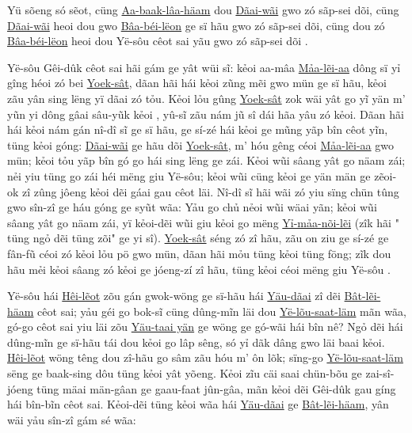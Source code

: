 \documentclass[twoside,twocolumn,a4paper,10pt]{memoir}
\begin{document}
\begin{scripture}
	Yü sõeng só sẽot, cüng \underline{Aa-baak-lâa-häam} dou \underline{Dãai-wãi} gwo zó sãp-sei dõi, cüng \underline{Dãai-wãi} heoi dou gwo \underline{Bâa-béi-lëon} ge sï hãu gwo zó sãp-sei dõi, cüng dou zó \underline{Bâa-béi-lëon} heoi dou Yë-sôu cêot sai yãu gwo zó sãp-sei dõi .
	
	Yë-sôu Gêi-dûk cêot sai hãi gám ge yât wüi sĩ: kẻoi aa-mâa \underline{Mảa-lẽi-aa} dông sï yỉ gîng héoi zó bei \underline{Yoek-sât}, dãan hãi hái kẻoi zũng mẽi gwo mün ge sï hãu, kẻoi zãu yân sing lëng yï dãai zó tỏu.
	Kẻoi lỏu gûng \underline{Yoek-sât} zok wäi yât go yĩ yän m' yũn yi dông gâai sâu-yũk kẻoi , yû-sĩ zãu nám jũ sî dái hãa yâu zó kẻoi.
	Dãan hãi hái kẻoi nám gán nî-dî sĩ ge sï hãu,  ge sí-zé hái kẻoi ge mũng yãp bîn cêot yĩn, tüng kẻoi góng: \underline{Dãai-wãi} ge hãu dõi \underline{Yoek-sât}, m' hóu gêng céoi \underline{Mảa-lẽi-aa} gwo mün; kẻoi tỏu yãp bîn gó go hái sing lëng ge zái.
	Kẻoi wũi sâang yât go näam zái; nẻi yiu tüng go zái héi mëng giu Yë-sôu; kẻoi wũi cüng kẻoi ge yän män ge zẽoi-ok zî zûng jôeng kẻoi dẽi gáai gau cêot läi.
	Nî-dî sĩ hãi wãi zó yiu sïng chün  tûng gwo sîn-zî ge háu góng ge syũt wãa:
	Yảu go chủ nẻoi wũi wäai yãn; kẻoi wũi sâang yât go näam zái, yï kẻoi-dẽi wũi giu kẻoi go mëng \underline{Yỉ-mảa-nõi-lẽi} (zîk hãi " tüng ngỏ dẽi tüng zõi" ge yi sî).
	\underline{Yoek-sât} séng zó zî hãu, zãu on ziu  ge sí-zé ge fân-fũ céoi zó kẻoi lỏu pö gwo mün,
	dãan hãi mỏu tüng kẻoi tüng föng; zĩk dou hãu mẻi kẻoi sâang zó kẻoi ge jóeng-zí zî hãu, tüng kẻoi céoi mëng giu Yë-sôu .
	
	
	
	\noindent
	Yë-sôu hái \underline{Hêi-lẽot} zõu gán gwok-wöng ge sï-hãu hái
	\underline{Yäu-dãai} zî dẽi \underline{Bât-lẽi-häam} cêot sai; yảu géi go bok-sĩ
	cüng dûng-mĩn läi dou \underline{Yë-lõu-saat-läm} mãn wãa, gó-go cêot sai yiu läi zõu \underline{Yäu-taai yän} ge wöng ge
	gó-wãi hái bîn nê? Ngỏ dẽi hái dûng-mĩn ge sï-hãu tái dou
	kẻoi go lâp sêng, só yỉ dãk dâng gwo läi baai kẻoi. \underline{Hêi-lẽot} wöng têng dou  zî-hãu go sâm zãu hóu
  m' ôn lõk; sïng-go \underline{Yë-lõu-saat-läm} sëng ge baak-sing dôu tüng
  kẻoi yât yõeng. Kẻoi zĩu cäi saai chün-bõu ge zai-sî-jóeng tüng mäai
  män-gâan ge gaau-faat jûn-gâa, mãn kẻoi dẽi Gêi-dûk gau gíng
  hái bîn-bĩn cêot sai. Kẻoi-dẽi tüng kẻoi wãa hái \underline{Yäu-dãai} ge \underline{Bât-lẽi-häam}, yân wäi yảu sîn-zî gám sé wãa:
  

\end{scripture}
\end{document}
